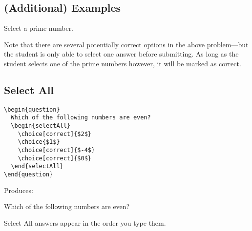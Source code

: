 \documentclass{ximera}
\begin{document}
\subsection{(Additional) Examples}


\begin{problem}
Select a prime number.
\begin{multipleChoice}
\end{multipleChoice}
\end{problem}

Note that there are several potentially correct options in the above
problem---but the student is only able to select one answer before submitting.
As long as the student selects one of the prime numbers however, it will be
marked as correct.

\subsection{Select All}

\begin{verbatim}
\begin{question}
  Which of the following numbers are even?
  \begin{selectAll}
    \choice[correct]{$2$}
    \choice{$1$}
    \choice[correct]{$-4$}
    \choice[correct]{$0$}
  \end{selectAll}
\end{question}
\end{verbatim}

Produces:

\begin{question}
  Which of the following numbers are even?
  \begin{selectAll}
  \end{selectAll}
\end{question}

\begin{remark}
  Select All answers appear in the order you type them.
\end{remark}


\end{document}
